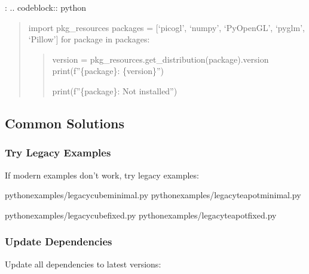 \documentclass[a4paper,10pt,english,openany,oneside]{sphinxmanual}
\begin{document}
\sphinxAtStartPar
{}:
.. code\sphinxhyphen{}block:: python
\begin{quote}

\sphinxAtStartPar
import pkg\_resources
packages = {[}‘picogl’, ‘numpy’, ‘PyOpenGL’, ‘pyglm’, ‘Pillow’{]}
for package in packages:
\begin{quote}
\begin{description}
\sphinxAtStartPar
version = pkg\_resources.get\_distribution(package).version
print(f”\{package\}: \{version\}”)

\sphinxAtStartPar
print(f”\{package\}: Not installed”)

\end{description}
\end{quote}
\end{quote}


\subsection{Common Solutions}
\label{\detokenize{troubleshooting:common-solutions}}

\subsubsection{Try Legacy Examples}
\label{\detokenize{troubleshooting:try-legacy-examples}}
\sphinxAtStartPar
If modern examples don’t work, try legacy examples:

\begin{sphinxVerbatim}[commandchars=\\\{\}]
pythonexamples/legacy\PYGZus{}cube\PYGZus{}minimal.py
pythonexamples/legacy\PYGZus{}teapot\PYGZus{}minimal.py

pythonexamples/legacy\PYGZus{}cube\PYGZus{}fixed.py
pythonexamples/legacy\PYGZus{}teapot\PYGZus{}fixed.py
\end{sphinxVerbatim}


\subsubsection{Update Dependencies}
\label{\detokenize{troubleshooting:update-dependencies}}
\sphinxAtStartPar
Update all dependencies to latest versions:
\end{document}
